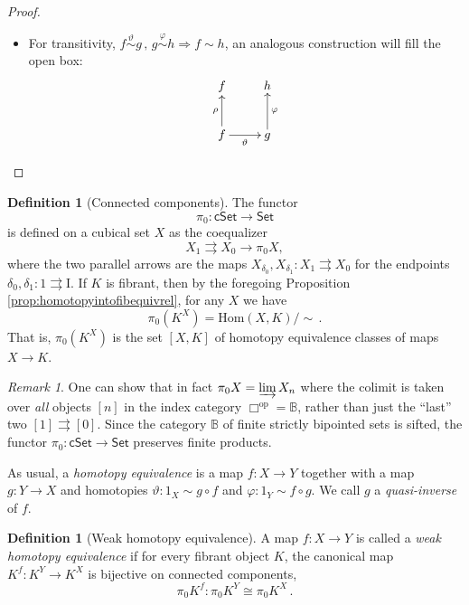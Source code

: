 \documentclass[11pt]{amsart}
\newcommand{\B}{\ensuremath{\mathbb{B}}}
\newcommand{\Set}{\ensuremath{\mathsf{Set}}}
\newcommand{\cSet}{\ensuremath{\mathsf{cSet}}}
\newcommand{\op}[1]{\ensuremath{{#1}^{\mathrm{op}}}}
\newcommand{\ra}{\ensuremath{\rightarrow}}
\renewcommand{\to}{\ensuremath{\rightarrow}}
\renewcommand{\hom}{\ensuremath{\mathrm{Hom}}}
\newcommand{\I}{\ensuremath{\mathrm{I}}}
\theoremstyle{remark}
\newtheorem{remark}[theorem]{Remark}
\theoremstyle{definition}
\newtheorem{definition}[theorem]{Definition}
\begin{document}
\begin{proof}
\begin{itemize}
\item For transitivity, $f\stackrel{\vartheta}{\sim} g\,,\, g\stackrel{\varphi}{\sim} h\Rightarrow f\sim h$, an analogous  construction will fill the open box:
\begin{equation*}%
\xymatrix{
f  & h  \\
f \ar[u]^{\rho} \ar[r]_\vartheta & g \ar[u]_\varphi
}
\end{equation*}
\end{itemize}
\end{proof}

\begin{definition}[Connected components]
The functor $$\pi_0 : \cSet\ra\Set$$ is defined on a cubical set $X$ as the coequalizer $$X_1\rightrightarrows X_0\ra \pi_0X,$$ where the two parallel arrows are the maps $X_{\delta_0}, X_{\delta_1} : X_1 \rightrightarrows X_0$ for the endpoints $\delta_0, \delta_1 : 1 \rightrightarrows \I$.   If $K$ is fibrant, then by the foregoing Proposition \ref{prop:homotopyintofibequivrel}, for any $X$ we have  $$\pi_0(K^X) = \hom(X,K)/\!\!\sim\,.$$  That is, $\pi_0(K^X)$ is the set  $[X, K]$ of homotopy equivalence classes of maps $X\ra K$.
\end{definition}

\begin{remark}
One can show that in fact $\pi_0X = \varinjlim X_n$ where the colimit is taken over \emph{all} objects $[n]$ in the index category $\op\Box = \B$, rather than just the ``last'' two $[1]\rightrightarrows [0]$. Since the category $\B$ of finite strictly bipointed sets is sifted, 
the functor $\pi_0: \cSet\ra\Set$ preserves finite products. 
\end{remark}

As usual, a \emph{homotopy equivalence} is a map $f : X\to Y$ together with a map $g: Y\ra X$ and homotopies $\vartheta : 1_X \sim g\circ f$ and $\varphi : 1_Y\sim f\circ g$.  We call $g$ a \emph{quasi-inverse} of $f$.

\begin{definition}[Weak homotopy equivalence]\label{def:WHE}
A map $f: X\ra Y$ is called a \emph{weak homotopy equivalence} if for every fibrant object $K$, the canonical map $K^f : K^Y \ra K^X$ is bijective on connected components,  $$\pi_0K^f : \pi_0K^Y \cong \pi_0K^X\,.$$
\end{definition}
\end{document}
